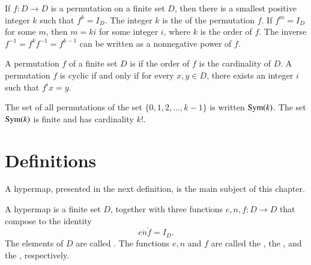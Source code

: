 If $f:D\to D$ is a permutation on a finite set $D$, then there is a
smallest positive integer $k$ such that $f^k=I_D$.  The integer $k$ is
the  of the permutation $f$.  If $f^m=I_D$ for some
$m$, then $m = k i$ for some integer $i$, where $k$ is the order of
$f$. The inverse $f^{-1} = f^k f^{-1} = f^{k-1}$ can be written as a
nonnegative power of $f$.

A permutation $f$ of a finite set $D$ is  if the order
of $f$ is the cardinality of $D$.  A permutation $f$ is cyclic if and
only if for every $x,y\in D$, there exists an integer $i$ such that
$f^i x = y$.

The set of all permutations of the set $\{0,1,2,\ldots,k-1\}$ is written ${\operatorname{Sym}}(k)$.
The set ${\operatorname{Sym}}(k)$ is finite and has cardinality $k!$.



\section{Definitions}

A hypermap, presented in the next definition, is the main subject of this chapter.

\begin{definition}\label{def:hypermap}  
  A hypermap is a finite set $D$, together with three functions
  $e,n,f:D\to D$ that compose to the identity
  \[ 
e\ocirc n\ocirc f = I_D.
\]  The
elements of $D$ are called .  The functions $e,n$ and
$f$ are called the , the , and
the , respectively.  %
%
%
%
%
%
%
%
%
\end{definition}


